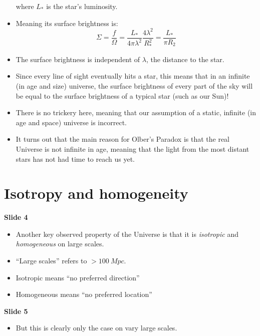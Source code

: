 \documentclass[11pt]{article}
\begin{document}
\begin{itemize}
  where $L_\ast$ is the star's luminosity.
  \item Meaning its surface brightness is:
  \begin{equation}
  \Sigma = \frac{f}{\Omega}=\frac{L_\ast}{4\pi \lambda^2}\frac{4\lambda^2}{R_\ast^2} = \frac{L_\ast}{\pi R_2}
  \end{equation}
  \item The surface brightness is independent of $\lambda$, the distance to the star.
  \item Since every line of sight eventually hits a star, this means that in an infinite (in age and size) universe, the surface brightness of every part of the sky will be equal to the surface brightness of a typical star (such as our Sun)!
  \item There is no trickery here, meaning that our assumption of a static, infinite (in age and space) universe is incorrect.
  \item It turns out that the main reason for Olber's Paradox is that the real Universe is not infinite in age, meaning that the light from the most distant stars has not had time to reach us yet.
\end{itemize}

\section{Isotropy and homogeneity}
{\bf Slide 4}
\begin{itemize}
\item Another key observed property of the Universe is that it is {\it isotropic} and {\it homogeneous} on large scales.
\item ``Large scales'' refers to $>100~Mpc$.
\item Isotropic means ``no preferred direction''
\item Homogeneous means ``no preferred location''
\end{itemize}

\vspace{3mm}
\noindent
{\bf Slide 5}
\begin{itemize}
\item But this is clearly only the case on vary large scales.
\end{itemize}
\end{document}
